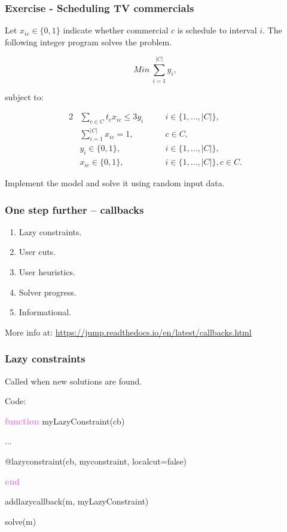 \documentclass{beamer}
\begin{document}
\begin{frame}
  \frametitle{Exercise - Scheduling TV commercials}

  \footnotesize

  Let $x_{ic} \in \{0, 1\}$ indicate whether commercial $c$ is schedule to interval $i$. The following integer program solves the problem.
  
  \begin{equation*}
  Min\ \sum_{i=1}^{|C|} y_i,
  \end{equation*}

  subject to:

  \vspace{-0.7cm}
  \begin{alignat*}{2}
    &\sum_{c \in C} t_c x_{ic} \leq 3 y_i && \quad i \in \{1, \ldots, |C|\},\\
    & \sum_{i=1}^{|C|} x_{ic} = 1, && \quad c \in C,\\
    & y_i \in \{0, 1\}, && \quad i \in \{1, \ldots, |C|\},\\
    & x_{ic} \in \{0, 1\}, && \quad i \in \{1, \ldots, |C|\}, c \in C. 
  \end{alignat*}

Implement the model and solve it using random input data.
  
\end{frame}


\begin{frame}
  \frametitle{One step further -- callbacks}

  \begin{enumerate}
  \item [] Lazy constraints.
  \item [] User cuts.
  \item [] User heuristics.
  \item [] Solver progress.
  \item [] Informational.
  \end{enumerate}

    \vfill \footnotesize
  More info at: \url{https://jump.readthedocs.io/en/latest/callbacks.html}
\end{frame}


\begin{frame}
  \frametitle{Lazy constraints}
  Called when new solutions are found.

  \begin{block}{Code:}\footnotesize
    
    \textcolor{violet}{\textbf{function}} myLazyConstraint(cb)
    
    \hspace{1cm}    ...
    
    \hspace{1cm}    @lazyconstraint(cb, myconstraint, localcut=false)

    \textcolor{violet}{\bf end}
    
    addlazycallback(m, myLazyConstraint)

    solve(m)
  \end{block}

\end{frame}
\end{document}
